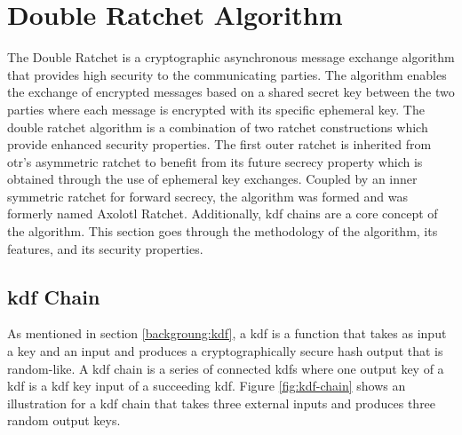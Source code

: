 \section{Double Ratchet Algorithm}
\label{ch:dr}

The Double Ratchet is a cryptographic asynchronous message exchange algorithm that provides high security to the communicating parties. The algorithm enables the exchange of encrypted messages based on a shared secret key between the two parties where each message is encrypted with its specific ephemeral key.
The double ratchet algorithm is a combination of two ratchet constructions which provide enhanced security properties.
The first outer ratchet is inherited from \gls{otr}'s asymmetric ratchet to benefit from its future secrecy property which is obtained through the use of ephemeral key exchanges. Coupled by an inner symmetric ratchet for forward secrecy, the algorithm was formed and was formerly named Axolotl Ratchet. Additionally, \gls{kdf} chains are a core concept of the algorithm. This section goes through the methodology of the algorithm, its features, and its security properties.

\subsection{\gls*{kdf} Chain}
As mentioned in section \ref{backgroung:kdf}, a \gls{kdf} is a function that takes as input a key and an input and produces a cryptographically secure hash output that is random-like.
A \gls{kdf} chain is a series of connected \gls{kdf}s where one output key of a \gls{kdf} is a \gls{kdf} key input of a succeeding \gls{kdf}. Figure \ref{fig:kdf-chain} shows an illustration for a \gls{kdf} chain that takes three external inputs and produces three random output keys.


